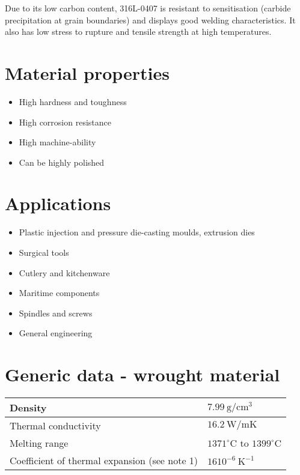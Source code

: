 \documentclass[10pt]{article}
\begin{document}
Due to its low carbon content, 316L-0407 is resistant to sensitisation (carbide precipitation at grain boundaries) and displays good welding characteristics. It also has low stress to rupture and tensile strength at high temperatures.

\section*{Material properties}
\begin{itemize}
  \item High hardness and toughness

  \item High corrosion resistance

  \item High machine-ability

  \item Can be highly polished

\end{itemize}

\section*{Applications}
\begin{itemize}
  \item Plastic injection and pressure die-casting moulds, extrusion dies

  \item Surgical tools

  \item Cutlery and kitchenware

  \item Maritime components

  \item Spindles and screws

  \item General engineering

\end{itemize}

\section*{Generic data - wrought material}
\begin{center}
\begin{tabular}{|l|l|}
\hline
Density & $7.99 \mathrm{~g} / \mathrm{cm}^{3}$ \\
\hline
Thermal conductivity & $16.2 \mathrm{~W} / \mathrm{mK}$ \\
\hline
Melting range & $1371^{\circ} \mathrm{C}$ to $1399^{\circ} \mathrm{C}$ \\
\hline
Coefficient of thermal expansion (see note 1) & $1610^{-6} \mathrm{~K}^{-1}$ \\
\hline
\end{tabular}
\end{center}
\end{document}

